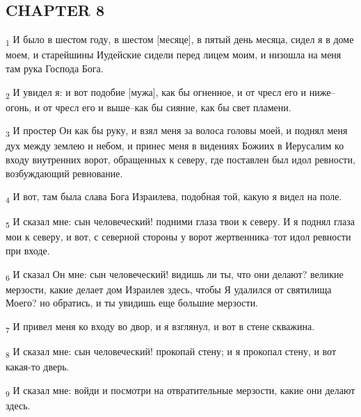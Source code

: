 \subsection{CHAPTER 8}
\begin{tcolorbox}
\textsubscript{1} И было в шестом году, в шестом [месяце], в пятый день месяца, сидел я в доме моем, и старейшины Иудейские сидели перед лицем моим, и низошла на меня там рука Господа Бога.
\end{tcolorbox}
\begin{tcolorbox}
\textsubscript{2} И увидел я: и вот подобие [мужа], как бы огненное, и от чресл его и ниже--огонь, и от чресл его и выше--как бы сияние, как бы свет пламени.
\end{tcolorbox}
\begin{tcolorbox}
\textsubscript{3} И простер Он как бы руку, и взял меня за волоса головы моей, и поднял меня дух между землею и небом, и принес меня в видениях Божиих в Иерусалим ко входу внутренних ворот, обращенных к северу, где поставлен был идол ревности, возбуждающий ревнование.
\end{tcolorbox}
\begin{tcolorbox}
\textsubscript{4} И вот, там была слава Бога Израилева, подобная той, какую я видел на поле.
\end{tcolorbox}
\begin{tcolorbox}
\textsubscript{5} И сказал мне: сын человеческий! подними глаза твои к северу. И я поднял глаза мои к северу, и вот, с северной стороны у ворот жертвенника--тот идол ревности при входе.
\end{tcolorbox}
\begin{tcolorbox}
\textsubscript{6} И сказал Он мне: сын человеческий! видишь ли ты, что они делают? великие мерзости, какие делает дом Израилев здесь, чтобы Я удалился от святилища Моего? но обратись, и ты увидишь еще большие мерзости.
\end{tcolorbox}
\begin{tcolorbox}
\textsubscript{7} И привел меня ко входу во двор, и я взглянул, и вот в стене скважина.
\end{tcolorbox}
\begin{tcolorbox}
\textsubscript{8} И сказал мне: сын человеческий! прокопай стену; и я прокопал стену, и вот какая-то дверь.
\end{tcolorbox}
\begin{tcolorbox}
\textsubscript{9} И сказал мне: войди и посмотри на отвратительные мерзости, какие они делают здесь.
\end{tcolorbox}
